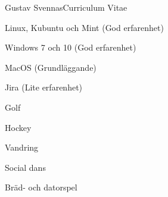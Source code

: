 \documentclass{article}
\begin{document}
\begin{cv}{Gustav Svennas}{Curriculum Vitae}
\cvseparator
\begin{cvitem}
    Linux, Kubuntu och Mint (God erfarenhet)
\end{cvitem}

\cvseparator
\begin{cvitem}
    Windows 7 och 10 (God erfarenhet)
\end{cvitem}

\cvseparator
\begin{cvitem}
    MacOS (Grundläggande)
\end{cvitem}

\cvseparator
\begin{cvitem}
    Jira (Lite erfarenhet)
\end{cvitem}






\cvseparator
\begin{cvitem}
    Golf
\end{cvitem}

\cvseparator
\begin{cvitem}
    Hockey 
\end{cvitem}

\cvseparator
\begin{cvitem}
    Vandring
\end{cvitem}

\cvseparator
\begin{cvitem}
    Social dans
\end{cvitem}

\cvseparator
\begin{cvitem}
    Bräd- och datorspel
\end{cvitem}


\end{cv}
\end{document}
